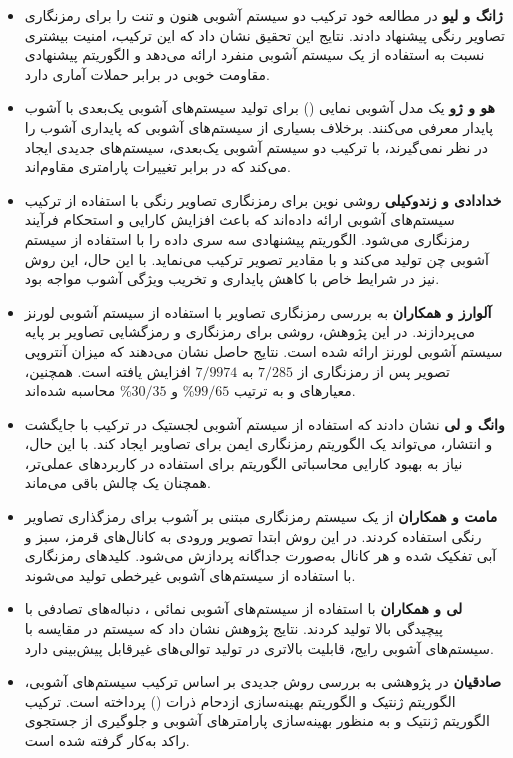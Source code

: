 \begin{itemize}
    \item \textbf{ژانگ و لیو\cite{ref3}} در مطالعه خود ترکیب دو سیستم آشوبی هنون و تنت را برای رمزنگاری تصاویر رنگی پیشنهاد دادند. نتایج این تحقیق نشان داد که این ترکیب، امنیت بیشتری نسبت به استفاده از یک سیستم آشوبی منفرد ارائه می‌دهد و الگوریتم پیشنهادی مقاومت خوبی در برابر حملات آماری دارد.
    \item \textbf{هو و ژو\cite{ref4}} یک مدل آشوبی نمایی () برای تولید سیستم‌های آشوبی یک‌بعدی با آشوب پایدار معرفی می‌کنند. برخلاف بسیاری از سیستم‌های آشوبی که پایداری آشوب را در نظر نمی‌گیرند،  با ترکیب دو سیستم آشوبی یک‌بعدی، سیستم‌های جدیدی ایجاد می‌کند که در برابر تغییرات پارامتری مقاوم‌اند.
    \item \textbf{خدادادی و زندوکیلی\cite{ref7}} روشی نوین برای رمزنگاری تصاویر رنگی با استفاده از ترکیب سیستم‌های آشوبی ارائه داده‌اند که باعث افزایش کارایی و استحکام فرآیند رمزنگاری می‌شود. الگوریتم پیشنهادی سه سری داده را با استفاده از سیستم آشوبی چن تولید می‌کند و با مقادیر  تصویر ترکیب می‌نماید. با این حال، این روش نیز در شرایط خاص با کاهش پایداری و تخریب ویژگی آشوب مواجه بود.
    \item \textbf{آلوارز و همکاران\cite{ref6}} به بررسی رمزنگاری تصاویر با استفاده از سیستم آشوبی لورنز می‌پردازند. در این پژوهش، روشی برای رمزنگاری و رمزگشایی تصاویر بر پایه سیستم آشوبی لورنز ارائه شده است. نتایج حاصل نشان می‌دهند که میزان آنتروپی تصویر پس از رمزنگاری از $7/285$ به $7/9974$ افزایش یافته است. همچنین، معیارهای  و  به ترتیب $99/65$\% و $30/35$\% محاسبه شده‌اند.
    \item \textbf{وانگ و لی\cite{ref8}} نشان دادند که استفاده از سیستم آشوبی لجستیک در ترکیب با جایگشت و انتشار، می‌تواند یک الگوریتم رمزنگاری ایمن برای تصاویر ایجاد کند. با این حال، نیاز به بهبود کارایی محاسباتی الگوریتم برای استفاده در کاربردهای عملی‌تر، همچنان یک چالش باقی می‌ماند.
    \item \textbf{مامت و همکاران\cite{ref9}} از یک سیستم رمزنگاری مبتنی بر آشوب برای رمزگذاری تصاویر رنگی استفاده کردند. در این روش ابتدا تصویر ورودی به کانال‌های قرمز، سبز و آبی تفکیک شده و هر کانال به‌صورت جداگانه پردازش می‌شود. کلیدهای رمزنگاری با استفاده از سیستم‌های آشوبی غیرخطی تولید می‌شوند.
    \item \textbf{لی و همکاران\cite{ref10}} با استفاده از سیستم‌های آشوبی نمائی ، دنباله‌های تصادفی با پیچیدگی بالا تولید کردند. نتایج پژوهش نشان داد که سیستم  در مقایسه با سیستم‌های آشوبی رایج، قابلیت بالاتری در تولید توالی‌های غیرقابل پیش‌بینی دارد.
    \item \textbf{صادقیان\cite{ref11}} در پژوهشی به بررسی روش جدیدی بر اساس ترکیب سیستم‌های آشوبی، الگوریتم ژنتیک و الگوریتم بهینه‌سازی ازدحام ذرات () پرداخته است. ترکیب الگوریتم ژنتیک و  به منظور بهینه‌سازی پارامترهای آشوبی و جلوگیری از جستجوی راکد به‌کار گرفته شده است.

\end{itemize}
